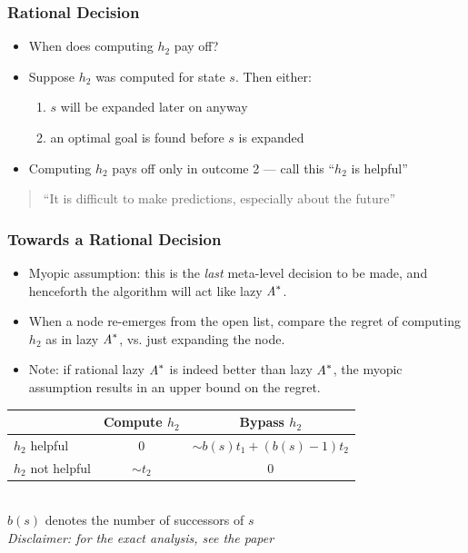 \documentclass{beamer}
\begin{document}
\begin{frame}
\frametitle{Rational Decision}
\begin{itemize}
  \item When does computing $h_2$ pay off?
  \item Suppose $h_2$ was computed for state $s$. Then either:
  \begin{enumerate}
    \item $s$ will be expanded later on anyway
    \item an optimal goal is found before $s$ is expanded
  \end{enumerate}
  \item Computing $h_2$ pays off only in outcome 2 --- call this
  ``$h_2$ is helpful''
\end{itemize}

\begin{block}{}
\begin{quote}
``It is difficult to make predictions, especially about the future''
\vskip5mm
  \hspace*{}
\end{quote}
\end{block}

\end{frame}

\begin{frame}
\frametitle{Towards a Rational Decision}
\begin{itemize}
  \item Myopic assumption: this is the {\em last}
        meta-level decision to be made, and henceforth the algorithm
        will act like lazy $\text{\it A}^{\ast}$.
\item When a node re-emerges from the open list,
      compare the regret of computing $h_2$ as in lazy $\text{\it A}^{\ast}$, vs.
      just expanding the node.
\item Note: if rational lazy $\text{\it A}^{\ast}$ is indeed better than lazy
  $\text{\it A}^{\ast}$, the myopic assumption results in an upper bound
  on the regret.
\end{itemize}

\begin{center}
\begin{tabular}{|l|c|c|}
\hline
               & Compute $h_2$ & Bypass $h_2$\\
\hline
$h_2$ helpful &   0            & $\sim b(s) t_1 + (b(s) - 1)t_2$\\
\hline
$h_2$ not helpful & $\sim t_2$      & 0 \\
\hline
\end{tabular}\\
\vspace{3mm}
$b(s)$ denotes the number of successors of $s$\\
\vspace{3mm}
{\em Disclaimer: for the exact analysis, see the paper}
\end{center}
\end{frame}
\end{document}
